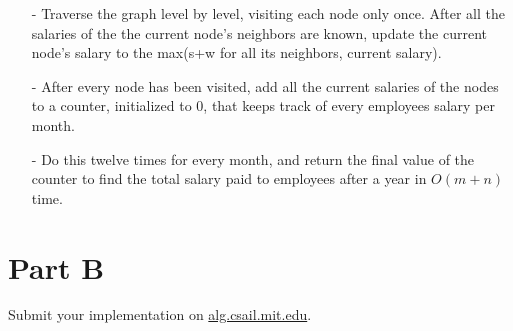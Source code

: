 \documentclass[12pt,twoside]{article}
\begin{document}
\begin{problems}
\problem 
\begin{itemize}
	\item[-] Traverse the graph level by level, visiting each node only once. After all the salaries of the the current node's neighbors are known, update the current node's salary to the max(s+w for all its neighbors, current salary).
	\item[-] After every node has been visited, add all the current salaries of the nodes to a counter, initialized to 0, that keeps track of every employees salary per month.
	\item[-] Do this twelve times for every month, and return the final value of the counter to find the total salary paid to employees after a year in $ O(m+n) $ time. 
\end{itemize}

\section*{Part B}

\problem
Submit your implementation on \url{alg.csail.mit.edu}.

\end{problems}
\end{document}
